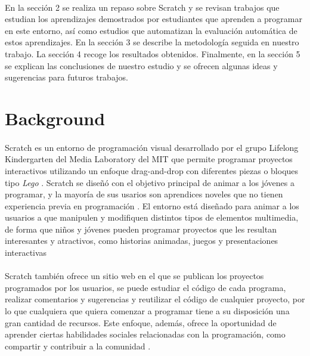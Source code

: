 \documentclass[a4paper,10pt]{article}
\begin{document}
\paragraph{}En la sección 2 se realiza un repaso sobre Scratch y se revisan trabajos que estudian los aprendizajes demostrados por estudiantes que aprenden a programar en este entorno, así como estudios que automatizan la evaluación automática de estos aprendizajes. En la sección 3 se describe la metodología seguida en nuestro trabajo. La sección 4 recoge los resultados obtenidos. Finalmente, en la sección 5  se explican las conclusiones de nuestro estudio y se ofrecen algunas ideas y sugerencias para futuros trabajos.

\section{Background}

\paragraph{}Scratch es un entorno de programación visual desarrollado por el grupo Lifelong Kindergarten del Media Laboratory del MIT que permite programar proyectos interactivos utilizando un enfoque drag-and-drop con diferentes piezas o bloques tipo \textit{Lego} \cite{resnick2009scratch}. Scratch se diseñó con el objetivo principal de animar a los jóvenes a programar, y la mayoría de sus usarios son aprendices noveles que no tienen experiencia previa en programación \cite{maloney2010scratch}. El entorno está diseñado para animar a los usuarios a que manipulen y modifiquen distintos tipos de elementos multimedia, de forma que niños y jóvenes pueden programar proyectos que les resultan interesantes y atractivos, como historias animadas, juegos y presentaciones interactivas \cite{maloney2008programming}
\paragraph{}Scratch también ofrece un sitio web en el que se publican los proyectos programados por los usuarios, se puede estudiar el código de cada programa, realizar comentarios y sugerencias y reutilizar el código de cualquier proyecto, por lo que cualquiera que quiera comenzar a programar tiene a su disposición una gran cantidad de recursos. Este enfoque, además, ofrece la oportunidad de aprender ciertas habilidades sociales relacionadas con la programación, como compartir y contribuir a la comunidad \cite{scaffidi2012skill}.
\end{document}
